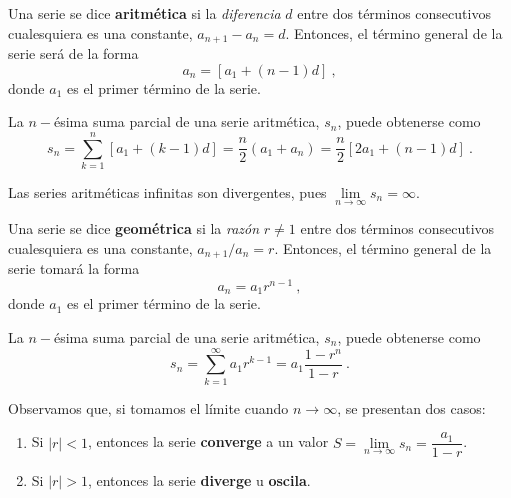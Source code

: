 \begin{defi} 
    Una serie se dice \textbf{aritmética} si la \emph{diferencia} $d$ entre dos términos consecutivos cualesquiera es una constante, $a_{n+1} - a_n = d$. Entonces, el término general de la serie será de la forma
    \begin{equation}
        a_n = [a_1 + (n-1)d] \ ,
    \end{equation}
    donde $a_1$ es el primer término de la serie.
    
    La $n-$ésima suma parcial de una serie aritmética, $s_n$, puede obtenerse como
    \begin{equation}
        s_n =  \sum_{k=1}^n [a_1 + (k-1)d] = \frac{n}{2} (a_1 + a_n) = \frac{n}{2}[2a_1 + (n-1)d] \ . 
    \end{equation}
    
    Las series aritméticas infinitas son divergentes, pues $\lim\limits_{n\to \infty} s_n = \infty$.
\end{defi}


\begin{defi} 
    Una serie se dice \textbf{geométrica} si la \emph{razón} $r \neq 1$ entre dos términos consecutivos cualesquiera es una constante, $a_{n+1}/a_n = r$. Entonces, el término general de la serie tomará la forma
    \begin{equation}
        a_n = a_1 r^{n-1} \ ,
    \end{equation}
    donde $a_1$ es el primer término de la serie.

    La $n-$ésima suma parcial de una serie aritmética, $s_n$, puede obtenerse como 
    \begin{equation}
        s_n = \sum_{k=1}^\infty a_1 r^{k-1} = a_1 \frac{1-r^n}{1-r} \ .
    \end{equation}

    Observamos que, si tomamos el límite cuando $n \to \infty$, se presentan dos casos:
    \begin{enumerate}
        \item Si $|r| < 1$, entonces la serie \textbf{converge} a un valor $S = \lim\limits_{n\to\infty} s_n = \dfrac{a_1}{1-r}$.
        \item Si $|r| > 1$, entonces la serie \textbf{diverge} u \textbf{oscila}.
    \end{enumerate}
\end{defi}

